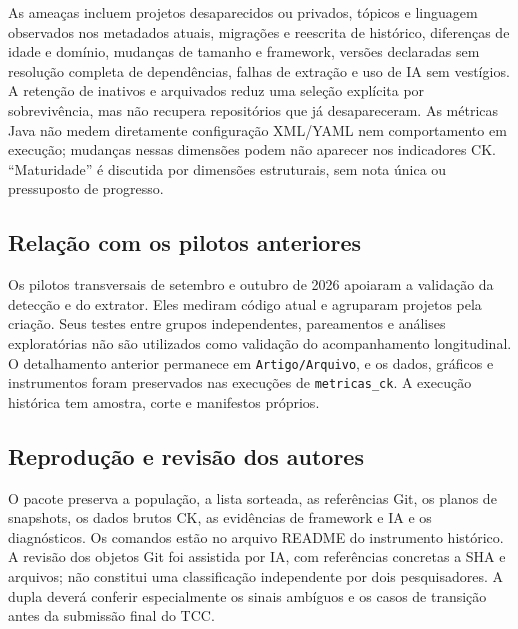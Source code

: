 As ameaças incluem projetos desaparecidos ou privados, tópicos e linguagem observados nos metadados atuais, migrações e reescrita de histórico, diferenças de idade e domínio, mudanças de tamanho e framework, versões declaradas sem resolução completa de dependências, falhas de extração e uso de IA sem vestígios. A retenção de inativos e arquivados reduz uma seleção explícita por sobrevivência, mas não recupera repositórios que já desapareceram. As métricas Java não medem diretamente configuração XML/YAML nem comportamento em execução; mudanças nessas dimensões podem não aparecer nos indicadores CK. ``Maturidade'' é discutida por dimensões estruturais, sem nota única ou pressuposto de progresso.

\subsection{Relação com os pilotos anteriores}

Os pilotos transversais de setembro e outubro de 2026 apoiaram a validação da detecção e do extrator. Eles mediram código atual e agruparam projetos pela criação. Seus testes entre grupos independentes, pareamentos e análises exploratórias não são utilizados como validação do acompanhamento longitudinal. O detalhamento anterior permanece em \texttt{Artigo/Arquivo}, e os dados, gráficos e instrumentos foram preservados nas execuções de \texttt{metricas\_ck}. A execução histórica tem amostra, corte e manifestos próprios.

\subsection{Reprodução e revisão dos autores}

O pacote preserva a população, a lista sorteada, as referências Git, os planos de snapshots, os dados brutos CK, as evidências de framework e IA e os diagnósticos. Os comandos estão no arquivo README do instrumento histórico. A revisão dos objetos Git foi assistida por IA, com referências concretas a SHA e arquivos; não constitui uma classificação independente por dois pesquisadores. A dupla deverá conferir especialmente os sinais ambíguos e os casos de transição antes da submissão final do TCC.

